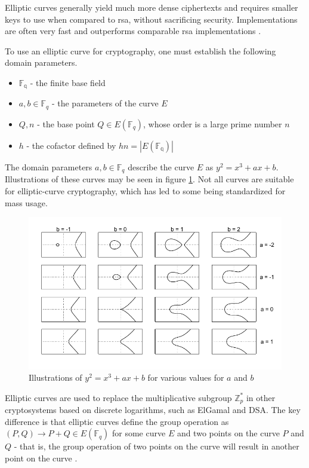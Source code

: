 Elliptic curves generally yield much more dense ciphertexts and requires smaller keys to use when compared to \gls{rsa}, without sacrificing security. Implementations are often very fast and outperforms comparable \gls{rsa} implementations \cite{delfs2007}.

To use an elliptic curve for cryptography, one must establish the following domain parameters\cite{delfs2007}.

\begin{itemize}
    \item $\mathbb{F_q}$ - the finite base field
    \item $a,b\in\mathbb{F}_q$ - the parameters of the curve $E$
    \item $Q,n$ - the base point $Q\in E(\mathbb{F}_q)$, whose order is a large prime number $n$
    \item $h$ - the cofactor defined by $hn=|E(\mathbb{F_q})|$
\end{itemize}

The domain parameters $a,b\in\mathbb{F}_q$ describe the curve $E$ as $y^2=x^3+ax+b$. Illustrations of these curves may be seen in figure \ref{figure:background:elliptic-curves}. Not all curves are suitable for elliptic-curve cryptography, which has led to some being standardized for mass usage\cite{nist2018}.

\begin{figure}
    \centering
    \includegraphics{chapters/background/figures/elliptic-curves.pdf}
    \caption{Illustrations of $y^2=x^3+ax+b$ for various values for $a$ and $b$}
    \label{figure:background:elliptic-curves}
\end{figure}

Elliptic curves are used to replace the multiplicative subgroup $\mathbb{Z}_p^*$ in other cryptosystems based on discrete logarithms, such as ElGamal and DSA\cite{delfs2007}. The key difference is that elliptic curves define the group operation as $(P, Q)\to P+Q\in E(\mathbb{F}_q)$ for some curve $E$ and two points on the curve $P$ and $Q$ - that is, the group operation of two points on the curve will result in another point on the curve \cite{delfs2007}.

